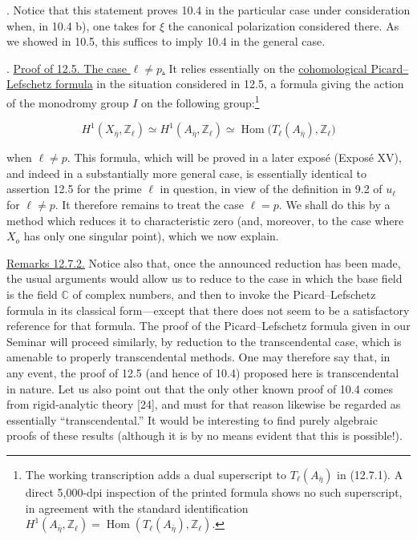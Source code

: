 \medskip
{}. Notice that this statement proves 10.4 in the particular case
under consideration when, in 10.4 b), one takes for $\xi$ the canonical
polarization considered there. As we showed in 10.5, this suffices to
imply 10.4 in the general case.

\medskip
{}. \underline{Proof of 12.5. The case $\ell\ne p$.} It relies
essentially on the \underline{cohomological Picard--Lefschetz formula}
in the situation considered in 12.5, a formula giving the action of the
monodromy group $I$ on the following group:\footnote{The working
transcription adds a dual superscript to $T_\ell(A_{\bar\eta})$ in
(12.7.1). A direct 5,000-dpi inspection of the printed formula shows no
such superscript, in agreement with the standard identification
$H^1(A_{\bar\eta},\mathbb Z_\ell)=
\operatorname{Hom}(T_\ell(A_{\bar\eta}),\mathbb Z_\ell)$.}

\begin{equation}\tag{12.7.1}
 H^1(X_{\bar\eta},\mathbb Z_\ell)
 \simeq H^1(A_{\bar\eta},\mathbb Z_\ell)
 \simeq\operatorname{Hom}
   \bigl(T_\ell(A_{\bar\eta}),\mathbb Z_\ell\bigr)
\end{equation}

\noindent
when $\ell\ne p$. This formula, which will be proved in a later expos\'e
(Expos\'e XV), and indeed in a substantially more general case, is
essentially identical to assertion 12.5 for the prime $\ell$ in
question, in view of the definition in 9.2 of $u_\ell$ for $\ell\ne p$.
It therefore remains to treat the case $\ell=p$. We shall do this by a
method which reduces it to characteristic zero (and, moreover, to the
case where $X_o$ has only one singular point), which we now explain.

\medskip
\noindent
\underline{Remarks 12.7.2.} Notice also that, once the announced
reduction has been made, the usual arguments would allow us to reduce to
the case in which the base field is the field $\mathbb C$ of complex
numbers, and then to invoke the Picard--Lefschetz formula in its classical
form---except that there does not seem to be a satisfactory reference
for that formula. The proof of the Picard--Lefschetz formula given in our
Seminar will proceed similarly, by reduction to the transcendental case,
which is amenable to properly transcendental methods. One may therefore
say that, in any event, the proof of 12.5 (and hence of 10.4) proposed
here is transcendental in nature. Let us also point out that the only
other known proof of 10.4 comes from rigid-analytic theory [24], and must
for that reason likewise be regarded as essentially ``transcendental.''
It would be interesting to find purely algebraic proofs of these results
(although it is by no means evident that this is possible!).
